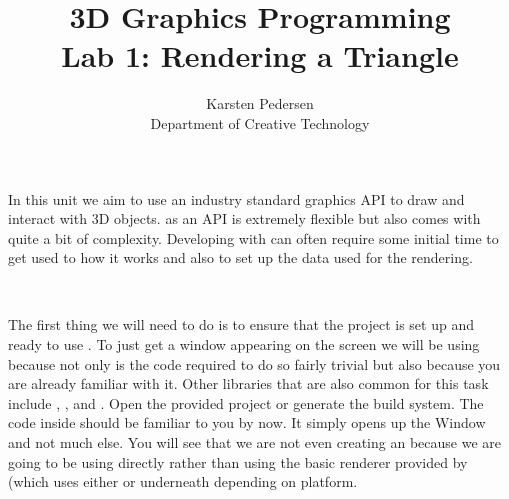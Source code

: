 \documentclass[10pt]{article}
\begin{document}
\title{3D Graphics Programming \\
  \normalsize Lab 1: Rendering a Triangle}

\author{Karsten Pedersen\\ Department of Creative Technology}
\maketitle

In this unit we aim to use an industry standard graphics API to draw
and interact with 3D objects.  as an API is extremely flexible
but also comes with quite a bit of complexity.  Developing with 
can often require some initial time to get used to how it works and also
to set up the data used for the rendering.

\

The first thing we will need to do is to ensure that the project is
set up and ready to use . To just get a window appearing
on the screen we will be using  because not only is the code
required to do so fairly trivial but also because you are already familiar
with it.  Other libraries that are also common for this task include
, ,  and . Open
the provided  project or generate
the  build system.  The code inside 
should be familiar to you by now. It simply opens up the 
Window and not much else.  You will see that we are not even creating an
 because we are going to be using 
directly rather than using the basic renderer provided by 
(which uses either  or  underneath depending
on platform.

\end{document}
